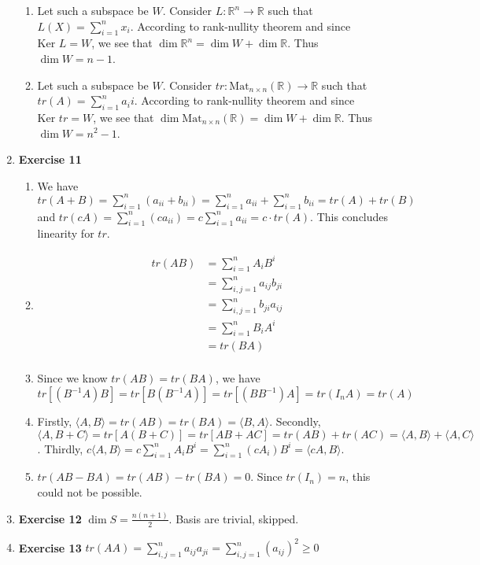 \documentclass[11pt]{article}
\begin{document}
\begin{enumerate}
\begin{enumerate}
\item Let such a subspace be \(W\). Consider \(L:\mathbb{R}^n\rightarrow \mathbb{R}\) such that \(L(X)=\sum\limits_{i=1}^n x_i\). According to rank-nullity theorem and since \(\text{Ker }L=W\), we see that \(\dim \mathbb{R}^n=\dim W+\dim \mathbb{R}\). Thus \(\dim W=n-1\).
\item Let such a subspace be \(W\). Consider \(tr:\text{Mat}_{n\times n}(\mathbb{R})\rightarrow \mathbb{R}\) such that \(tr(A)=\sum\limits_{i=1}^n a_ii\). According to rank-nullity theorem and since \(\text{Ker }tr=W\), we see that \(\dim \text{Mat}_{n\times n}(\mathbb{R})=\dim W+\dim \mathbb{R}\). Thus \(\dim W=n^2-1\).
\end{enumerate}
\item \textbf{Exercise 11}
\label{sec:org9987eef}
\begin{enumerate}
\item We have \(tr(A+B)=\sum\limits_{i=1}^n(a_{ii}+b_{ii})=\sum\limits_{i=1}^n a_{ii}+\sum\limits_{i=1}^n b_{ii}=tr(A)+tr(B)\) and \(tr(cA)=\sum\limits_{i=1}^n(ca_{ii})=c\sum\limits_{i=1}^n a_{ii}=c\cdot tr(A)\). This concludes linearity for \(tr\).
\item $$\begin{aligned}
   tr(AB)&=\sum\limits_{i=1}^n A_iB^i\\
   &=\sum\limits_{i,j=1}^n a_{ij}b_{ji}\\
   &=\sum\limits_{i,j=1}^n b_{ji}a_{ij}\\
   &=\sum\limits_{i=1}^{n} B_iA^i\\
   &=tr(BA)\\
   \end{aligned}$$
\item Since we know \(tr(AB)=tr(BA)\), we have \(tr[(B^{-1}A)B]=tr[B(B^{-1}A)]=tr[(BB^{-1})A]=tr(I_nA)=tr(A)\)
\item Firstly, \(\langle A,B \rangle = tr(AB)=tr(BA)=\langle B,A \rangle\). Secondly, \(\langle A,B+C \rangle=tr[A(B+C)]=tr[AB+AC]=tr(AB)+tr(AC)=\langle A,B\rangle+\langle A,C\rangle\). Thirdly, \(c\langle A,B \rangle=c\sum\limits_{i=1}^n A_iB^i=\sum\limits_{i=1}^n (cA_i)B^i=\langle cA,B \rangle\).
\item \(tr(AB-BA)=tr(AB)-tr(BA)=0\). Since \(tr(I_n)=n\), this could not be possible.
\end{enumerate}
\item \textbf{Exercise 12}
\label{sec:org679ad2a}
\(\dim S=\frac{n(n+1)}{2}\). Basis are trivial, skipped.
\item \textbf{Exercise 13}
\label{sec:org8fd5644}
\(tr(AA)=\sum\limits_{i,j=1}^n a_{ij}a_{ji}=\sum\limits_{i,j=1}^n (a_{ij})^2\geq 0\)
\end{enumerate}
\end{document}
